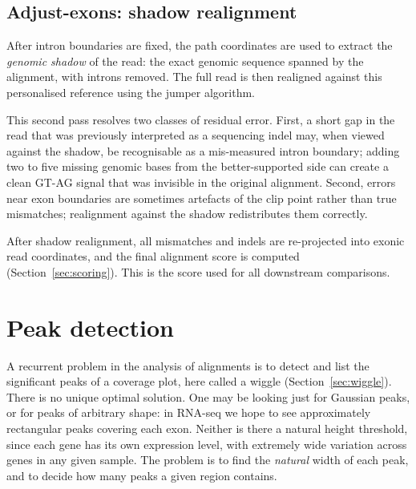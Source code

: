\documentclass[11pt]{article}
\begin{document}
\subsection{Adjust-exons: shadow realignment}
\label{sec:adjust_exons}

After intron boundaries are fixed, the path coordinates are used
to extract the \emph{genomic shadow} of the read: the exact genomic
sequence spanned by the alignment, with introns removed.
The full read is then realigned against this personalised reference
using the jumper algorithm.

This second pass resolves two classes of residual error.
First, a short gap in the read that was previously interpreted as
a sequencing indel may, when viewed against the shadow, be
recognisable as a mis-measured intron boundary; adding two to
five missing genomic bases from the better-supported side can
create a clean GT-AG signal that was invisible in the original
alignment.
Second, errors near exon boundaries are sometimes
artefacts of the clip point rather than true mismatches; realignment
against the shadow redistributes them correctly.

After shadow realignment, all mismatches and indels are re-projected
into exonic read coordinates, and the final alignment score is
computed (Section~\ref{sec:scoring}).
This is the score used for all downstream comparisons.

\section{Peak detection}
\label{sec:peak_detection}

A recurrent problem in the analysis of alignments is to detect and list
the significant peaks of a coverage plot, here called a wiggle
(Section~\ref{sec:wiggle}).
There is no unique optimal solution. One may be looking just for
Gaussian peaks, or for peaks of arbitrary shape: in RNA-seq we hope to
see approximately rectangular peaks covering each exon. Neither is there
a natural height threshold, since each gene has its own expression
level, with extremely wide variation across genes in any given sample.
The problem is to find the \emph{natural} width of each peak, and to
decide how many peaks a given region contains.
\end{document}
